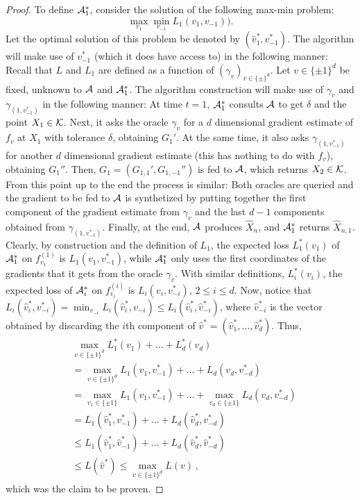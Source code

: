 \begin{proof}
To define $\mathcal{A}_1^*$, consider the solution of the following max-min problem:
\[
\max_{v_1} \min_{v_{-1}} L_1(v_1, v_{-1})).
\]
Let the optimal solution of this problem be denoted by $(\hat{v}_1^*,v_{-1}^*)$.
The algorithm will make use of $v_{-1}^*$ (which it does have access to) in the following manner:
Recall that $L$ and $L_1$ are defined as a function of $(\gamma_v)_{v\in \{\pm\}^d}$.
Let $v\in \{\pm 1\}^d$ be fixed, unknown to $\mathcal{A}$ and $\mathcal{A}_1^*$. 
The algorithm construction will make use of $\gamma_v$ and $\gamma_{(1,v_{-1}^*)}$ in the following manner:
At time $t=1$, $\mathcal{A}_1^*$ consults $\mathcal{A}$ to get $\delta$ and the point $X_1\in \mathcal{K}$.
Next, it asks the oracle $\gamma_v$ for a $d$ dimensional gradient estimate of $f_v$ at $X_1$ with tolerance $\delta$,
obtaining $G_1'$.
At the same time, it also asks $\gamma_{(1,v_{-1}^*)}$ for another $d$ dimensional gradient estimate (this has nothing to do with $f_v$), obtaining $G_1''$.
Then, $G_1 = (G_{1,1}',G_{1,-1}'')$ is fed to $\mathcal{A}$, which returns $X_2\in \mathcal{K}$. From this point up to the end the process is similar: Both oracles are queried and the gradient to be fed to $\mathcal{A}$ is synthetized by putting together the first component of the gradient estimate from $\gamma_v$ and the last $d-1$ components obtained from $\gamma_{(1,v_{-1}^*)}$.
Finally, at the end, $\mathcal{A}$ produces $\hat{X}_n$, and $\mathcal{A}_1^*$ returns $\hat{X}_{n,1}$.
Clearly, by construction and the definition of $L_1$,
the expected loss $L^*_1(v_1)$ of $\mathcal{A}_1^*$ on $f_{v_1}^{(1)}$ is $L_1(v_1,v_{-1}^*)$, while $\mathcal{A}_1^*$ only uses the first coordinates of the gradients that it gets from the oracle $\gamma_v$.
With similar definitions, $L^*_i(v_i)$, the expected loss of $\mathcal{A}_i^*$ on $f_{v_i}^{(i)}$ is $L_i(v_i,v_{-i}^*)$, $2\le i \le d$.
Now, notice that $L_i(\hat{v}_i^*,v_{-i}^*) = \min_{v_{-i} } L_i(\hat{v}_i^*,v_{-i}) \le L_i(\hat{v}_i^*, \hat{v}_{-i}^*)$,
where $\hat{v}_{-i}^*$ is the vector obtained by discarding the $i$th component of $\hat{v}^* = (\hat{v}_1^*,\dots,\hat{v}_d^*)$.
Thus,
\begin{align*}
&\max_{v\in \{\pm 1 \}^d }
L^*_1(v_1) + \dots + L^*_d(v_d) \\
&   = \max_{v\in \{\pm 1 \}^d } L_1(v_1,v_{-1}^*) + \dots + L_d(v_d,v_{-d}^*)\\
& = \max_{v_1\in \{\pm 1\}} L_1(v_1,v_{-1}^*) + \dots +  \max_{v_d\in \{\pm 1\}} L_d(v_d,v_{-d}^*)\\
& = L_1(\hat{v}^*_1,v_{-1}^*) + \dots +   L_d(\hat{v}^*_d,v_{-d}^*)\\
& \le L_1(\hat{v}^*_1,\hat{v}_{-1}^*) + \dots +  L_d(\hat{v}^*_d,\hat{v}_{-d}^*)\\
& \le L(\hat{v}^*) \le \max_{v\in \{\pm 1\}^d } L(v)\,,
\end{align*}
which was the claim to be proven.
\end{proof}

